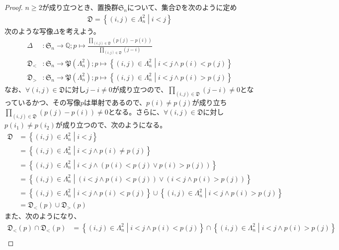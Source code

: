 \documentclass[dvipdfmx]{jsarticle}
\begin{document}
\begin{proof}
$n \geq 2$が成り立つとき、置換群$\mathfrak{S}_{n}$について、集合$\mathfrak{D}$を次のように定め
\begin{align*}
\mathfrak{D} =\left\{ (i,j) \in \varLambda_{n}^{2} \middle| i < j \right\}
\end{align*}
次のような写像$\varDelta$を考えよう。
\begin{align*}
\varDelta&:\mathfrak{S}_{n} \rightarrow \mathbb{Q};p \mapsto \frac{\prod_{(i,j)\in \mathfrak{D} } \left( p(j) - p(i) \right)}{\prod_{(i,j)\in \mathfrak{D}} (j - i)}\\
\mathfrak{D}_{<}&:\mathfrak{S}_{n}\mathfrak{\rightarrow P}\left( \varLambda_{n}^{2} \right);p \mapsto \left\{ (i,j) \in \varLambda_{n}^{2} \middle| i < j \land p(i) < p(j) \right\}\\
\mathfrak{D}_{>}&:\mathfrak{S}_{n}\mathfrak{\rightarrow P}\left( \varLambda_{n}^{2} \right);p \mapsto \left\{ (i,j) \in \varLambda_{n}^{2} \middle| i < j \land p(i) > p(j) \right\}
\end{align*}
なお、$\forall(i,j)\in \mathfrak{D}$に対し$j - i \neq 0$が成り立つので、$\prod_{(i,j)\in \mathfrak{D} } (j - i) \neq 0$となっているかつ、その写像$p$は単射であるので、$p(i) \neq p(j)$が成り立ち$\prod_{(i,j)\in \mathfrak{D} } \left( p(j) - p(i) \right) \neq 0$となる。さらに、$\forall(i,j)\in \mathfrak{D}$に対し$p\left( i_{1} \right) \neq p\left( i_{2} \right)$が成り立つので、次のようになる。
\begin{align*}
\mathfrak{D} &= \left\{ (i,j) \in \varLambda_{n}^{2} \middle| i < j \right\}\\
&= \left\{ (i,j) \in \varLambda_{n}^{2} \middle| i < j \land p(i) \neq p(j) \right\}\\
&= \left\{ (i,j) \in \varLambda_{n}^{2} \middle| i < j \land \left( p(i) < p(j) \vee p(i) > p(j) \right) \right\}\\
&= \left\{ (i,j) \in \varLambda_{n}^{2} \middle| \left( i < j \land p(i) < p(j) \right) \vee \left( i < j \land p(i) > p(j) \right) \right\}\\
&= \left\{ (i,j) \in \varLambda_{n}^{2} \middle| i < j \land p(i) < p(j) \right\} \cup \left\{ (i,j) \in \varLambda_{n}^{2} \middle| i < j \land p(i) > p(j) \right\}\\
&= \mathfrak{D}_{<}(p) \cup \mathfrak{D}_{>}(p)
\end{align*}
また、次のようになり、
\begin{align*}
\mathfrak{D}_{<}(p) \cap \mathfrak{D}_{<}(p) &= \left\{ (i,j) \in \varLambda_{n}^{2} \middle| i < j \land p(i) < p(j) \right\} \cap \left\{ (i,j) \in \varLambda_{n}^{2} \middle| i < j \land p(i) > p(j) \right\}\\

\end{align*}
\end{proof}
\end{document}
